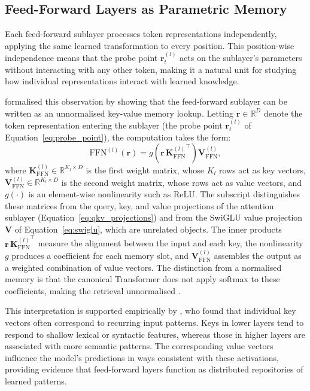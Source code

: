 \subsection{Feed-Forward Layers as Parametric Memory}
\label{subsec:ffn_memory}

Each feed-forward sublayer processes token representations independently, applying
the same learned transformation to every position. This position-wise independence
means that the probe point $\mathbf{r}_t^{(l)}$ acts on the sublayer's parameters
without interacting with any other token, making it a natural unit for studying
how individual representations interact with learned knowledge.

\citet{geva2021transformer} formalised this observation by showing that the
feed-forward sublayer can be written as an unnormalised key-value memory lookup.
Letting $\mathbf{r} \in \mathbb{R}^D$ denote the token representation entering the
sublayer (the probe point $\mathbf{r}_t^{(l)}$ of
Equation~\eqref{eq:probe_point}), the computation takes the form:
\begin{equation}
    \mathrm{FFN}^{(l)}(\mathbf{r})
    =
    g\!\left(\mathbf{r}\,{\mathbf{K}_{\mathrm{FFN}}^{(l)}}^{\!\top}\right)
    \mathbf{V}_{\mathrm{FFN}}^{(l)},
    \label{eq:ffn_kv_view}
\end{equation}
where $\mathbf{K}_{\mathrm{FFN}}^{(l)} \in \mathbb{R}^{K_l \times D}$ is the first
weight matrix, whose $K_l$ rows act as key vectors,
$\mathbf{V}_{\mathrm{FFN}}^{(l)} \in \mathbb{R}^{K_l \times D}$ is the second
weight matrix, whose rows act as value vectors, and $g(\cdot)$ is an element-wise
nonlinearity such as ReLU. The subscript distinguishes these matrices from the
query, key, and value projections of the attention sublayer
(Equation~\eqref{eq:qkv_projections}) and from the SwiGLU value projection
$\mathbf{V}$ of Equation~\eqref{eq:swiglu}, which are unrelated objects. The inner
products $\mathbf{r}\,{\mathbf{K}_{\mathrm{FFN}}^{(l)}}^{\!\top}$ measure the
alignment between the input and each key, the nonlinearity $g$ produces a
coefficient for each memory slot, and $\mathbf{V}_{\mathrm{FFN}}^{(l)}$ assembles
the output as a weighted combination of value vectors. The distinction from a
normalised memory is that the canonical Transformer does not apply softmax to
these coefficients, making the retrieval unnormalised \citep{geva2021transformer}.

This interpretation is supported empirically by \citet{geva2021transformer}, who
found that individual key vectors often correspond to recurring input patterns.
Keys in lower layers tend to respond to shallow lexical or syntactic features,
whereas those in higher layers are associated with more semantic patterns. The
corresponding value vectors influence the model's predictions in ways consistent
with these activations, providing evidence that feed-forward layers function as
distributed repositories of learned patterns.
